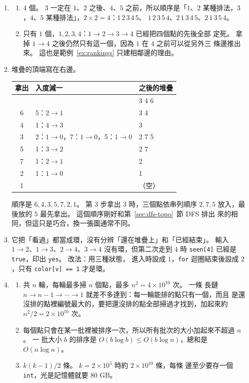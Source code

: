 \begin{enumerate}
\item
\begin{enumerate}
\item $4$ 個。 $3$ 一定在 $1$、$2$ 之後、$4$、$5$ 之前，所以順序是「$1$、$2$
某種排法，$3$，$4$、$5$ 某種排法」，$2 \times 2 = 4$：$1\,2\,3\,4\,5$、
$1\,2\,3\,5\,4$、$2\,1\,3\,4\,5$、$2\,1\,3\,5\,4$。
\item 只有 $1$ 個，$1, 2, 3, 4$：$1 \to 2 \to 3 \to 4$ 已經把四個點的先後全部
定死。 拿掉 $1 \to 4$ 之後仍然只有這一個，因為 $1$ 在 $4$ 之前可以從另外三
條邊推出來。 這也是範例~\ref{ex:rankings} 只建相鄰邊的理由。
\end{enumerate}

\item 堆疊的頂端寫在右邊。
\begin{center}
\begin{tabular}{cll}
\toprule
拿出 & 入度減一 & 之後的堆疊 \\
\midrule
 & & 3 4 6 \\
6 & 5：$2 \to 1$ & 3 4 \\
4 & 1：$4 \to 3$ & 3 \\
3 & 2：$1 \to 0$，7：$1 \to 0$，5：$1 \to 0$ & 2 7 5 \\
5 & 1：$3 \to 2$ & 2 7 \\
7 & 1：$2 \to 1$ & 2 \\
2 & 1：$1 \to 0$ & 1 \\
1 & & （空）\\
\bottomrule
\end{tabular}
\end{center}
順序是 $6, 4, 3, 5, 7, 2, 1$。 第 3 步拿出 $3$ 時，三個點依串列順序 $2, 7, 5$
放入，最後放的 $5$ 最先拿出。 這個順序剛好和第~\ref{sec:dfs-topo}~節 DFS 排出
來的相同，但這只是巧合，換一張圖通常不同。

\item 它把「看過」都當成環，沒有分辨「還在堆疊上」和「已經結束」。 輸入
$1 \to 2$、$1 \to 3$、$2 \to 4$、$3 \to 4$ 沒有環，但第二次走到 $4$ 時
\texttt{seen[4]} 已經是 \texttt{true}，印出 \texttt{yes}。 改法：用三種狀態，
進入時設成 $1$，\texttt{for} 迴圈結束後設成 $2$，只有 \texttt{color[v] == 1}
才是環。

\item
\begin{enumerate}
\item 共 $n$ 輪，每輪最多掃 $n$ 個點，最多 $n^2 = 4 \times 10^{10}$ 次。 一條
長鏈 $n \to n - 1 \to \cdots \to 1$ 就差不多達到：每一輪能排的點只有一個，而且
是還沒排的點裡編號最大的，要把還沒排的點全部掃過才找到，加起來約
$n^2 / 2 = 2 \times 10^{10}$ 次。
\item 每個點只會在某一批裡被排序一次，所以所有批次的大小加起來不超過 $n$。 一
批大小 $b$ 的排序是 $O(b \log b) \le O(b \log n)$，總和是 $O(n \log n)$。
\item $k(k - 1)/2$ 條。 $k = 2 \times 10^5$ 時約 $2 \times 10^{10}$ 條，每條
邊至少要存一個 \texttt{int}，光是記憶體就要 $80$ GB。
\end{enumerate}


\end{enumerate}
